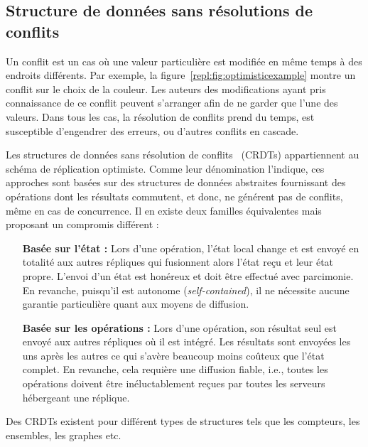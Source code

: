 \subsection{Structure de données sans résolutions de conflits}
\label{repl:subsec:crdts}

Un conflit est un cas où une valeur particulière est modifiée en même temps à
des endroits différents. Par exemple, la figure~\ref{repl:fig:optimisticexample}
montre un conflit sur le choix de la couleur. Les auteurs des modifications
ayant pris connaissance de ce conflit peuvent s'arranger afin de ne garder que
l'une des valeurs. Dans tous les cas, la résolution de conflits prend du temps,
est susceptible d'engendrer des erreurs, ou d'autres conflits en cascade.

Les structures de données sans résolution de
conflits~\cite{shapiro2011comprehensive} (CRDTs) appartiennent au schéma de
réplication optimiste. Comme leur dénomination l'indique, ces approches sont
basées sur des structures de données abstraites fournissant des opérations dont
les résultats commutent, et donc, ne générent pas de conflits, même en cas de
concurrence.  Il en existe deux familles équivalentes mais proposant un
compromis différent :
\begin{itemize}
\item [\textbf{Basée sur l'état :}] Lors d'une opération, l'état local change et
  est envoyé en totalité aux autres répliques qui fusionnent alors l'état reçu
  et leur état propre. L'envoi d'un état est honéreux et doit être effectué avec
  parcimonie. En revanche, puisqu'il est autonome (\emph{self-contained}), il ne
  nécessite aucune garantie particulière quant aux moyens de diffusion.
\item [\textbf{Basée sur les opérations :}] Lors d'une opération, son résultat
  seul est envoyé aux autres répliques où il est intégré. Les résultats sont
  envoyées les uns après les autres ce qui s'avère beaucoup moins coûteux que
  l'état complet. En revanche, cela requière une diffusion fiable, i.e., toutes
  les opérations doivent être inéluctablement reçues par toutes les serveurs
  hébergeant une réplique.
\end{itemize}

Des CRDTs existent pour différent types de structures tels que les compteurs,
les ensembles, les graphes etc. 


